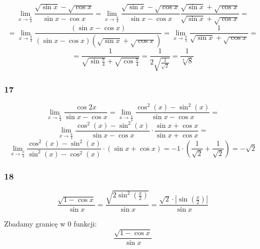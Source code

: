 \documentclass{article}
\begin{document}
\begin{equation*}
    \lim_{x \to \frac{\pi}{4}} \frac{\sqrt{\sin x} - \sqrt{\cos x}}{\sin x - \cos x} = \lim_{x \to \frac{\pi}{4}}\frac{\sqrt{\sin x} - \sqrt{\cos x}}{\sin x - \cos x} \frac{\sqrt{\sin x} + \sqrt{\cos x}}{\sqrt{\sin x} + \sqrt{\cos x}} =
\end{equation*}
\begin{equation*}
    = \lim_{x \to \frac{\pi}{4}}\frac{(\sin x - \cos x)} {(\sin x - \cos x) (\sqrt{\sin x} + \sqrt{\cos x})} = \lim_{x \to \frac{\pi}{4}} \frac{1} {\sqrt{\sin x} + \sqrt{\cos x}} = 
\end{equation*}
\begin{equation*}
    = \frac{1} {\sqrt{\sin \frac{\pi}{4}} + \sqrt{\cos \frac{\pi}{4}}} = \frac{1}{2\sqrt{\frac{1}{\sqrt{2}}}} = \frac{1}{\sqrt[4]{8}}
\end{equation*}

\subsubsection*{17}

\begin{equation*}
    \lim_{x \to \frac{\pi}{4}} \frac{\cos 2x}{\sin x - \cos x} = \lim_{x \to \frac{\pi}{4}} \frac{\cos^{2}(x) - \sin^{2}(x)}{\sin x - \cos x} = 
\end{equation*}
\begin{equation*}
    \lim_{x \to \frac{\pi}{4}} \frac{\cos^{2}(x) - \sin^{2}(x)}{\sin x - \cos x} \cdot \frac{\sin x + \cos x}{\sin x + \cos x} =
\end{equation*}
\begin{equation*}
    \lim_{x \to \frac{\pi}{4}} \frac{\cos^{2}(x) - \sin^{2}(x)}{\sin^{2}(x) - \cos^{2}(x)} \cdot (\sin x + \cos x) = -1 \cdot (\frac{1}{\sqrt{2}} + \frac{1}{\sqrt{2}} ) = - \sqrt{2}
\end{equation*}

\subsubsection*{18}

\begin{equation*}
    \frac{\sqrt{1 - \cos x}}{\sin x} =  \frac{\sqrt{2 \sin^{2}(\frac{x}{2})}}{\sin x} =  \frac{\sqrt{2} \cdot |\sin (\frac{x}{2})|}{\sin x}
\end{equation*}

Zbadamy granicę w \(0\) funkcji:
\begin{equation*}
    \frac{\sqrt{1 - \cos x}}{\sin x}
\end{equation*}
\end{document}
